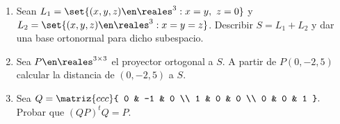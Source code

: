 \begin{enunciado}{\ejExtra}
  \begin{enumerate}[label=(\alph*)]
    \item
          Sean $L_1 = \set{(x,y,z) \en \reales^3 : x = y,\ z = 0}$ y
          $L_2 = \set{(x,y,z) \en \reales^3 : x = y = z }$. Describir $S = L_1 + L_2$ y dar una base ortonormal para dicho subespacio.

    \item
          Sea $P \en \reales^{3 \times 3}$ el proyector ortogonal a $S$. A partir de $P(0, -2, 5)$ calcular la distancia de
          $(0, -2, 5)$ a $S$.

    \item Sea
          $Q
            =
            \matriz{ccc}{
              0 & -1 & 0 \\
              1 & 0 & 0 \\
              0 & 0 & 1
            }.
          $
          Probar que $(QP)^tQ = P$.
  \end{enumerate}
\end{enunciado}

